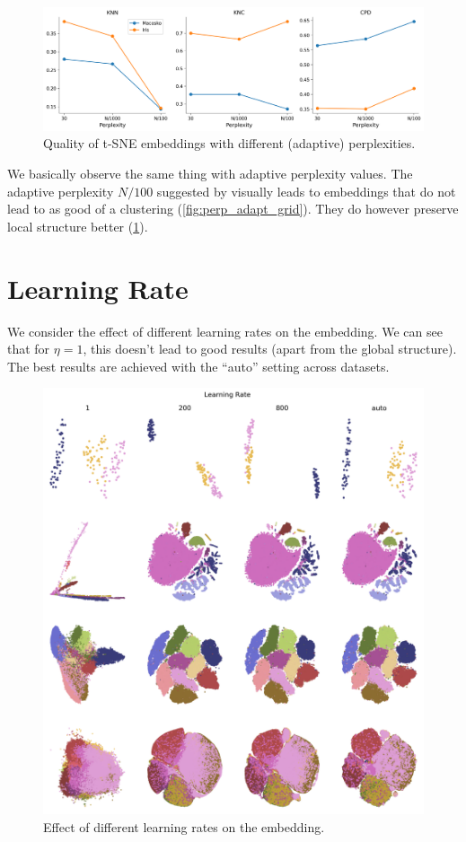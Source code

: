 \begin{figure}[h]
    \centering 
        \includegraphics[width=\linewidth]{../code/figures/perp_adapt_3_quality_measures.png}
        \caption{Quality of t-SNE embeddings with different (adaptive) perplexities.}
    \label{fig:perp_adapt_quality}
\end{figure}

We basically observe the same thing with adaptive perplexity values. 
The adaptive perplexity $N/100$ suggested by \cite{KoBe19SingleCell} visually leads to embeddings that do not lead to as good of a clustering (\ref{fig:perp_adapt_grid}). 
They do however preserve local structure better (\ref{fig:perp_adapt_quality}). 
\newpage 
\section{Learning Rate}
We consider the effect of different learning rates on the embedding. We can see that for $\eta=1$, this doesn't lead to good results (apart from the global structure). The best results are achieved with the \enquote{auto} setting across datasets. 
\begin{figure}[h]
    \centering 
        \includegraphics[width=\linewidth]{../code/figures/eta_embedding_grid_tab20b.png}
        \caption{Effect of different learning rates on the embedding.}
    \label{fig:eta_grid}
\end{figure} 

